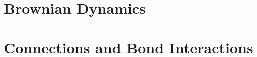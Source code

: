 \documentclass[twocolumn]{book}
\begin{document}
\chapter{Brownian Dynamics}



\chapter{Connections and Bond Interactions}
\label{chp:bonds}





%
%
%
%
%

%
%

\end{document}
